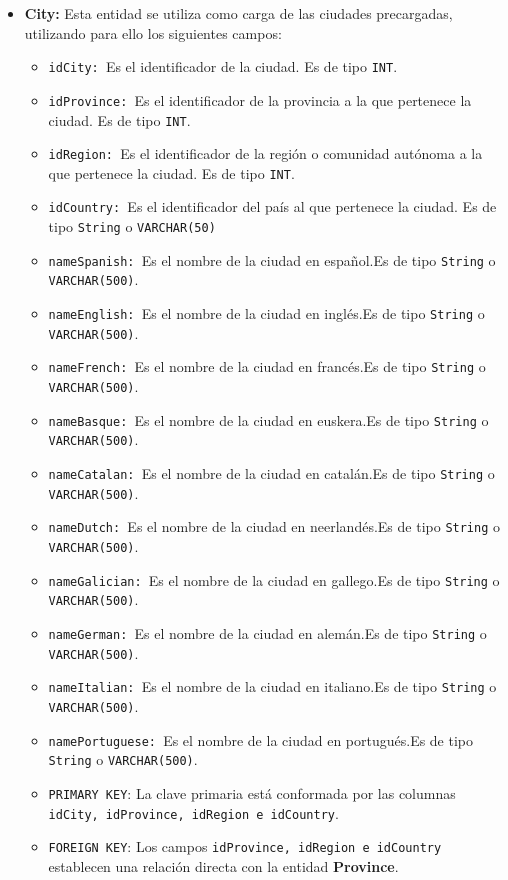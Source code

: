 \begin{itemize}
\item \textbf{City: }Esta entidad se utiliza como carga de las ciudades precargadas, utilizando para ello los siguientes campos:
      \begin{itemize}
        \item \texttt{idCity: }Es el identificador de la ciudad. Es de tipo \texttt{INT}.
        \item \texttt{idProvince: }Es el identificador de la provincia a la que pertenece la ciudad. Es de tipo \texttt{INT}.
        \item \texttt{idRegion: }Es el identificador de la región o comunidad autónoma a la que pertenece la ciudad. Es de tipo \texttt{INT}.
        \item \texttt{idCountry: }Es el identificador del país al que pertenece la ciudad. Es de tipo \texttt{String} o \texttt{VARCHAR(50)}
        \item \texttt{nameSpanish: }Es el nombre de la ciudad en español.Es de tipo \texttt{String} o \texttt{VARCHAR(500)}.
        \item \texttt{nameEnglish: }Es el nombre de la ciudad en inglés.Es de tipo \texttt{String} o \texttt{VARCHAR(500)}.
        \item \texttt{nameFrench: }Es el nombre de la ciudad en francés.Es de tipo \texttt{String} o \texttt{VARCHAR(500)}.
        \item \texttt{nameBasque: }Es el nombre de la ciudad en euskera.Es de tipo \texttt{String} o \texttt{VARCHAR(500)}.
        \item \texttt{nameCatalan: }Es el nombre de la ciudad en catalán.Es de tipo \texttt{String} o \texttt{VARCHAR(500)}.
        \item \texttt{nameDutch: }Es el nombre de la ciudad en neerlandés.Es de tipo \texttt{String} o \texttt{VARCHAR(500)}.
        \item \texttt{nameGalician: }Es el nombre de la ciudad en gallego.Es de tipo \texttt{String} o \texttt{VARCHAR(500)}.
        \item \texttt{nameGerman: }Es el nombre de la ciudad en alemán.Es de tipo \texttt{String} o \texttt{VARCHAR(500)}.
        \item \texttt{nameItalian: }Es el nombre de la ciudad en italiano.Es de tipo \texttt{String} o \texttt{VARCHAR(500)}.
        \item \texttt{namePortuguese: }Es el nombre de la ciudad en portugués.Es de tipo \texttt{String} o \texttt{VARCHAR(500)}.
        \item \texttt{PRIMARY KEY}: La clave primaria está conformada por las columnas \texttt{idCity, idProvince, idRegion e idCountry}.
        \item \texttt{FOREIGN KEY}: Los campos \texttt{idProvince, idRegion e idCountry} establecen una relación directa con la entidad \textbf{Province}.
      \end{itemize}
    

\end{itemize}
